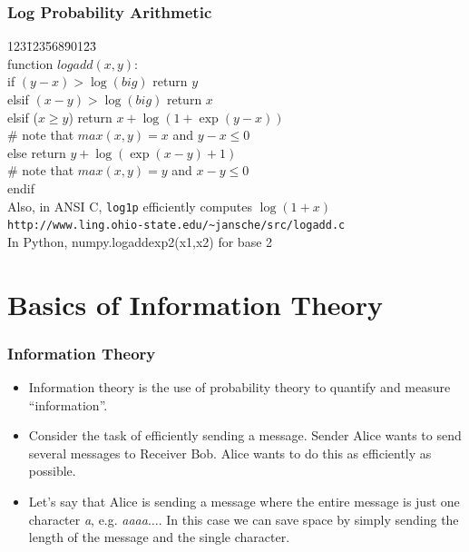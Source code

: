 \documentclass[handout]{beamer}
\begin{document}
\begin{frame}
\frametitle{Log Probability Arithmetic}
\begin{center}
\begin{tabbing}
123\=123\=568\=901\=23\=\kill \\
\textsf{function } $logadd(x,y):$ \\
\>  \textsf{if } $(y - x) > \log(big)$ \textsf{return } $y$ \\
\>  \textsf{elsif  } $(x - y) > \log(big)$ \textsf{return } $x$ \\
\>  \textsf{elsif ($x \geq y$)} \color{blue} return $x + \log(1 + \exp(y-x))$ \\
\>\> \color{red} \# {\small note that $max(x,y) = x$ and $y-x \leq 0$} \\
\> else \color{blue} return $y + \log(\exp(x-y) + 1)$ \\
\>\> \color{red} \# {\small note that $max(x,y) = y$ and $x-y \leq 0$} \\
\>  \textsf{endif } \\
\color{red} {\small Also, in ANSI C, {\tt log1p} efficiently computes $\log(1+x)$} \\
\color{red} {\footnotesize\tt http://www.ling.ohio-state.edu/\~{}jansche/src/logadd.c} \\
{\small In Python, numpy.logaddexp2(x1,x2) for base 2} 
\end{tabbing}
\end{center}

\end{frame}

\section{Basics of Information Theory}
\frame{\tableofcontents[currentsection]}

\begin{frame}
\frametitle{Information Theory}
\begin{itemize}[<+->]
\item Information theory is the use of probability theory to quantify
  and measure ``information''.
\item Consider the task of efficiently sending a message. Sender Alice
  wants to send several messages to Receiver Bob. Alice wants to do
  this as efficiently as possible.
\item Let's say that Alice is sending a message where the entire
  message is just one character {\em a}, e.g. {\em aaaa$\ldots$}. In
  this case we can save space by simply sending the length of the
  message and the single character.
\end{itemize}

\end{frame}
\end{document}
